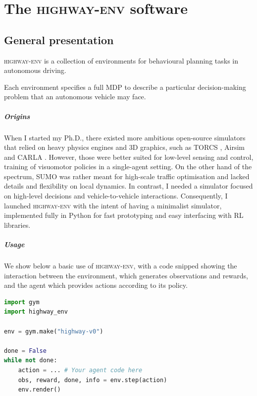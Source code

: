 \graphicspath{{3-Appendices/1-Appendix/}}

\chapter{The \textsc{highway-env} software}

\minitocStartChapterNoNewPage{}

\label{chapter:a}

\section{General presentation}

\textsc{highway-env} is a collection of environments for behavioural planning tasks in autonomous driving.

Each environment specifies a full \gls{MDP} to describe a particular decision-making problem that an autonomous vehicle may face.

\paragraph{Origins}
When I started my Ph.D., there existed more ambitious open-source simulators that relied on heavy physics engines and 3D graphics, such as TORCS \citep{Wymann15torcs:the}, Airsim \citep{shah2017airsim} and CARLA \citep{Dosovitskiy2017}. However, those were better suited for low-level sensing and control, \eg training of visuomotor policies in a single-agent setting. On the other hand of the spectrum, SUMO \citep{SUMO2018} was rather meant for high-scale traffic optimisation and lacked details and flexibility on local dynamics. In contrast, I needed a simulator focused on high-level decisions and vehicle-to-vehicle interactions. Consequently, I launched \textsc{highway-env} with the intent of having a minimalist simulator, implemented fully in Python for fast prototyping and easy interfacing with \gls{RL} libraries.

\paragraph{Usage}
We show below a basic use of \textsc{highway-env}, with a code snipped showing the interaction between the environment, which generates observations and rewards, and the agent which provides actions according to its policy.

\begin{lstlisting}[language=Python,frame=single,caption={Create, step and render the \texttt{highway-v0} environment},captionpos=b]
import gym
import highway_env

env = gym.make("highway-v0")

done = False
while not done:
    action = ... # Your agent code here
    obs, reward, done, info = env.step(action)
    env.render()
\end{lstlisting}

